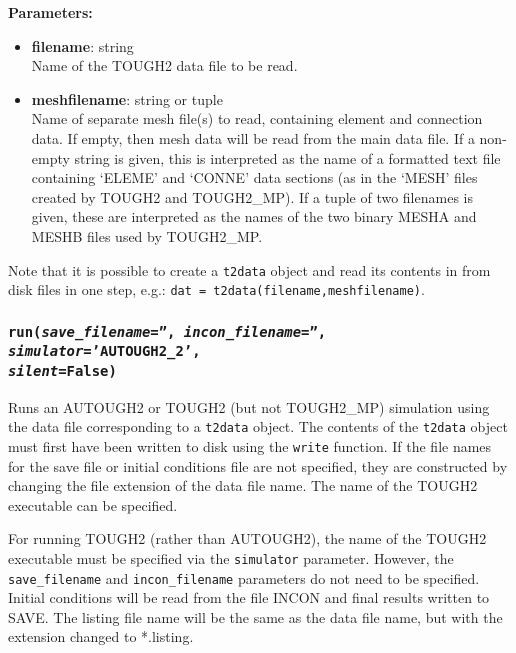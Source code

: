 \textbf{Parameters:}
\begin{itemize}
\item \textbf{filename}: string\\
  Name of the TOUGH2 data file to be read.
\item \textbf{meshfilename}: string or tuple\\
  Name of separate mesh file(s) to read, containing element and connection data.  If empty, then mesh data will be read from the main data file.  If a non-empty string is given, this is interpreted as the name of a formatted text file containing `ELEME' and `CONNE' data sections (as in the `MESH' files created by TOUGH2 and TOUGH2\_MP). If a tuple of two filenames is given, these are interpreted as the names of the two binary MESHA and MESHB files used by TOUGH2\_MP.
\end{itemize}

Note that it is possible to create a \texttt{t2data} object and read its contents in from disk files in one step, e.g.: \texttt{dat = t2data(filename,meshfilename)}.

\begin{snugshade}
\subsubsection{\texttt{run(\emph{save\_filename}='', \emph{incon\_filename}='', \emph{simulator}='AUTOUGH2\_2',\\
    \emph{silent}=False)}}
\end{snugshade}
\label{sec:t2data:run}

Runs an AUTOUGH2 or TOUGH2 (but not TOUGH2\_MP) simulation using the data file corresponding to a \texttt{t2data} object.  The contents of the \texttt{t2data} object must first have been written to disk using the \texttt{write} function.  If the file names for the save file or initial conditions file are not specified, they are constructed by changing the file extension of the data file name.  The name of the TOUGH2 executable can be specified.

For running TOUGH2 (rather than AUTOUGH2), the name of the TOUGH2 executable must be specified via the \texttt{simulator} parameter.  However, the \texttt{save\_filename} and \texttt{incon\_filename} parameters do not need to be specified.  Initial conditions will be read from the file INCON and final results written to SAVE.  The listing file name will be the same as the data file name, but with the extension changed to *.listing.

